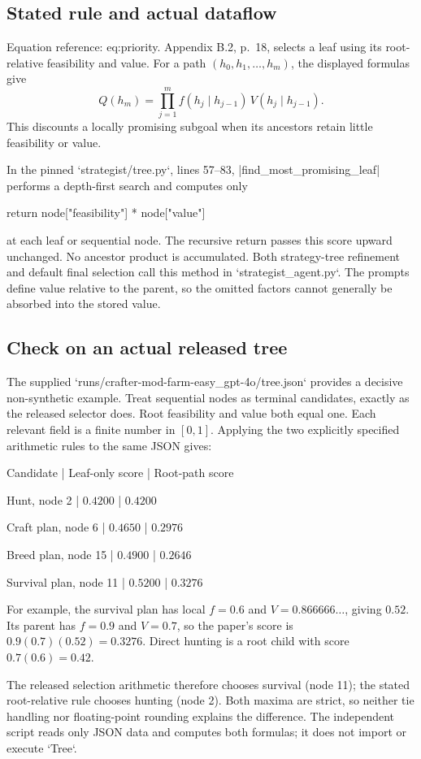 \documentclass[10pt]{article}
\begin{document}
\subsection*{Stated rule and actual dataflow}
Equation reference: eq:priority. Appendix B.2, p. 18, selects a leaf using its root-relative feasibility and value. For a path \((h_0,h_1,\ldots,h_m)\), the displayed formulas give \[
 Q(h_m)=\prod_{j=1}^m
         f(h_j\mid h_{j-1})\,V(h_j\mid h_{j-1}).\] This discounts a locally promising subgoal when its ancestors retain little feasibility or value.\par
In the pinned `strategist/tree.py`, lines 57–83, |find\_most\_promising\_leaf| performs a depth-first search and computes only\par
{\ttfamily\footnotesize return node["feasibility"] * node["value"]}\par
at each leaf or sequential node. The recursive return passes this score upward unchanged. No ancestor product is accumulated. Both strategy-tree refinement and default final selection call this method in `strategist\_agent.py`. The prompts define value relative to the parent, so the omitted factors cannot generally be absorbed into the stored value.\par
\subsection*{Check on an actual released tree}
The supplied `runs/crafter-mod-farm-easy\_gpt-4o/tree.json` provides a decisive non-synthetic example. Treat sequential nodes as terminal candidates, exactly as the released selector does. Root feasibility and value both equal one. Each relevant field is a finite number in \([0,1]\). Applying the two explicitly specified arithmetic rules to the same JSON gives:\par
Candidate | Leaf-only score | Root-path score\par
Hunt, node 2 | \(0.4200\) | \(0.4200\)\par
Craft plan, node 6 | \(0.4650\) | \(0.2976\)\par
Breed plan, node 15 | \(0.4900\) | \(0.2646\)\par
Survival plan, node 11 | \(0.5200\) | \(0.3276\)\par
For example, the survival plan has local \(f=0.6\) and \(V=0.866666\ldots\), giving \(0.52\). Its parent has \(f=0.9\) and \(V=0.7\), so the paper’s score is \(0.9(0.7)(0.52)=0.3276\). Direct hunting is a root child with score \(0.7(0.6)=0.42\).\par
The released selection arithmetic therefore chooses survival (node 11); the stated root-relative rule chooses hunting (node 2). Both maxima are strict, so neither tie handling nor floating-point rounding explains the difference. The independent script reads only JSON data and computes both formulas; it does not import or execute `Tree`.\par
\end{document}
